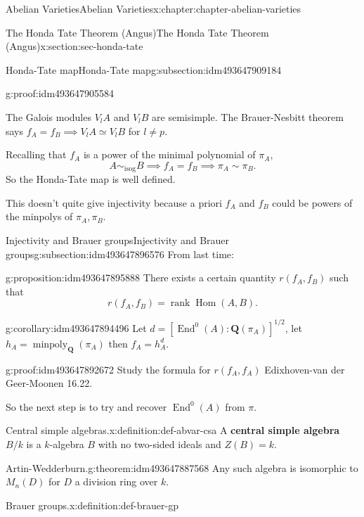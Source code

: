 \documentclass[oneside,10pt,]{book}
\newcommand{\terminology}[1]{\textbf{#1}}
\numberwithin{equation}{section}
\newcommand{\lb}{[}
\newcommand{\rb}{]}
\newcommand{\QQ}{\mathbf{Q}}
\DeclareMathOperator{\End}{End}
\DeclareMathOperator{\Hom}{Hom}
\DeclareMathOperator{\rank}{rank}
\begin{document}
\begin{chapterptx}{Abelian Varieties}{}{Abelian Varieties}{}{}{x:chapter:chapter-abelian-varieties}
\begin{sectionptx}{The Honda Tate Theorem (Angus)}{}{The Honda Tate Theorem (Angus)}{}{}{x:section:sec-honda-tate}
\begin{subsectionptx}{Honda-Tate map}{}{Honda-Tate map}{}{}{g:subsection:idm493647909184}
\begin{proofptx}{}{g:proof:idm493647905584}
\par
The Galois modules \(V_lA\) and \(V_l B\) are semisimple. The Brauer-Nesbitt theorem says \(f_A = f_B \implies V_lA \simeq V_lB \) for \(l\ne p\).%
\end{proofptx}
Recalling that \(f_A\) is a power of the minimal polynomial of \(\pi_A\),%
\begin{equation*}
A \sim_{\text{isog}} B\implies  f_A =f_B \implies \pi_A \sim \pi_B\text{.}
\end{equation*}
So the Honda-Tate map is well defined.%
\par
This doesn't quite give injectivity because a priori \(f_A\) and \(f_B\) could be powers of the minpolys of \(\pi_A, \pi_B\).%
\end{subsectionptx}
%
%
\typeout{************************************************}
\typeout{************************************************}
%
\begin{subsectionptx}{Injectivity and Brauer groups}{}{Injectivity and Brauer groups}{}{}{g:subsection:idm493647896576}
From last time:%
\begin{proposition}{}{}{g:proposition:idm493647895888}%
There exists a certain quantity \(r(f_A, f_B)\) such that%
\begin{equation*}
r(f_A, f_B) = \rank \Hom(A,B)\text{.}
\end{equation*}
%
\end{proposition}
\begin{corollary}{}{}{g:corollary:idm493647894496}%
Let \(d = \lb \End^0(A) : \QQ(\pi_A) \rb^{1/2}\), let \(h_A = \operatorname{minpoly}_\QQ(\pi_A)\) then \(f_A = h_A^d\).%
\end{corollary}
\begin{proofptx}{}{g:proof:idm493647892672}
Study the formula for \(r(f_A, f_A)\) Edixhoven-van der Geer-Moonen 16.22.%
\end{proofptx}
So the next step is to try and recover \(\End^0(A)\) from \(\pi\).%
\begin{definition}{Central simple algebras.}{x:definition:def-abvar-csa}%
A \terminology{central simple algebra} \(B/k\) is a \(k\)-algebra \(B\) with no two-sided ideals and \(Z(B) = k\).%
\end{definition}
\begin{theorem}{Artin-Wedderburn.}{}{g:theorem:idm493647887568}%
Any such algebra is isomorphic to \(M_n(D)\) for \(D\) a division ring over \(k\).%
\end{theorem}
\begin{definition}{Brauer groups.}{x:definition:def-brauer-gp}%

\end{definition}
\end{subsectionptx}
\end{sectionptx}
\end{chapterptx}
\end{document}
